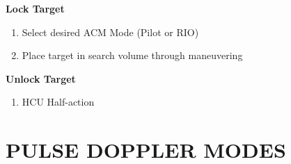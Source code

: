 \documentclass[fontMetropolis]{TechCheck}
\begin{document}
\begin{tableitemize}
{\begin{subitemize}
			\item \textbf{Lock Target}
			\begin{enumerate}
				\item Select desired ACM Mode (Pilot or RIO)
				\item Place target in search volume through maneuvering
			\end{enumerate}
			\item \textbf{Unlock Target}
			\begin{enumerate}[resume]
				\item HCU Half-action
			\end{enumerate}
		\end{subitemize}}
	\end{tableitemize}

	\clearpage

	\section{PULSE DOPPLER MODES}
\end{document}
